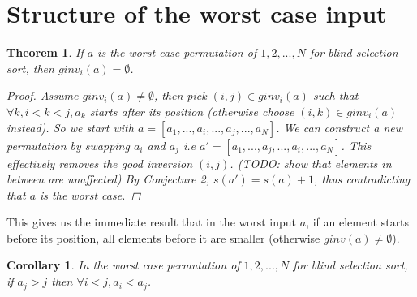 \documentclass{article}
\newtheorem{theorem}{Theorem}
\newtheorem{corollary}{Corollary}
\begin{document}
\section{Structure of the worst case input}
\begin{theorem}
    If $a$ is the worst case permutation of $1, 2, ..., N$ for blind selection sort, then $ginv_i(a) = \emptyset$.
    \begin{proof}
        Assume $ginv_i(a) \neq \emptyset$, then pick $(i, j) \in ginv_i(a)$ such that $\forall k, i < k < j, a_k$
        starts after its position (otherwise choose $(i, k) \in ginv_i(a)$ instead).
        So we start with $a = [a_1, ... , a_i, ...,  a_j, ..., a_N]$. We can construct a new permutation by swapping $a_i$ and $a_j$
        i.e $a' = [a_1, ... , a_j, ...,  a_i, ..., a_N]$. This effectively removes the good inversion $(i, j)$.
        (TODO: show that elements in between are unaffected)
        By Conjecture 2, $s(a') = s(a) + 1$, thus contradicting that $a$ is the worst case.
    \end{proof}
\end{theorem}
This gives us the immediate result that in the worst input $a$, if an element starts before its position, all elements before it are smaller (otherwise $ginv(a) \neq \emptyset$).
\begin{corollary}
    In the worst case permutation of $1, 2, ... , N$ for blind selection sort, if $a_j > j$ then $\forall i < j, a_i < a_j$.
\end{corollary}
\end{document}
